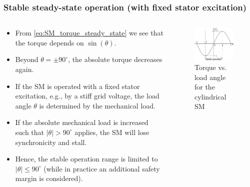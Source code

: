 \begin{frame}
	\frametitle{Stable steady-state operation (with fixed stator excitation)} 
	\begin{columns}
		\begin{column}{0.55\textwidth}
			\begin{itemize}
				\item<1-> From \eqref{eq:SM_torque_steady_state} we see that the torque depends on $\sin(\theta)$.
				\item<2-> Beyond $\theta = \pm 90^\circ$, the absolute torque decreases again.
				\item<3-> If the SM is operated with a fixed stator excitation, e.g., by a stiff grid voltage, the load angle $\theta$ is determined by the mechanical load.
				\item<4-> If the absolute mechanical load is increased such that $|\theta| > 90^\circ$ applies, the SM will lose synchronicity and stall.
				\item<5-> Hence, the stable operation range is limited to $|\theta| \leq 90^\circ$ (while in practice an additional safety margin is considered).
			\end{itemize}
        \end{column}
        \begin{column}{0.45\textwidth}
			\onslide<1->
            \begin{figure}
                \centering
                \includegraphics[width=0.95\textwidth]{fig/lec07/SM_steady_state_stability.pdf}
                \caption{Torque vs. load angle for the cylindrical SM}
                \label{fig:SM_steady_state_stability}
            \end{figure}
        \end{column}
    \end{columns}
\end{frame}

